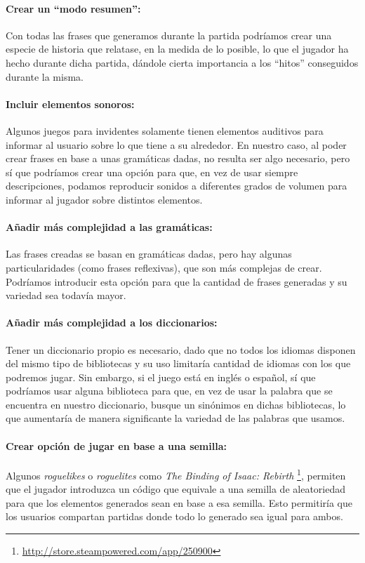 \paragraph{Crear un ``modo resumen'':} Con todas las frases que generamos durante la partida podríamos crear una especie de historia que relatase, en la medida de lo posible, lo que el jugador ha hecho durante dicha partida, dándole cierta importancia a los ``hitos'' conseguidos durante la misma.

\paragraph{Incluir elementos sonoros:} Algunos juegos para invidentes solamente tienen elementos auditivos para informar al usuario sobre lo que tiene a su alrededor. En nuestro caso, al poder crear frases en base a unas gramáticas dadas, no resulta ser algo necesario, pero sí que podríamos crear una opción para que, en vez de usar siempre descripciones, podamos reproducir sonidos a diferentes grados de volumen para informar al jugador sobre distintos elementos.

\paragraph{Añadir más complejidad a las gramáticas:} Las frases creadas se basan en gramáticas dadas, pero hay algunas particularidades (como frases reflexivas), que son más complejas de crear. Podríamos introducir esta opción para que la cantidad de frases generadas y su variedad sea todavía mayor. 

\paragraph{Añadir más complejidad a los diccionarios:} Tener un diccionario propio es necesario, dado que no todos los idiomas disponen del mismo tipo de bibliotecas y su uso limitaría cantidad de idiomas con los que podremos jugar. Sin embargo, si el juego está en inglés o español, sí que podríamos usar alguna biblioteca para que, en vez de usar la palabra que se encuentra en nuestro diccionario, busque un sinónimos en dichas bibliotecas, lo que aumentaría de manera significante la variedad de las palabras que usamos. 

\paragraph{Crear opción de jugar en base a una semilla:} Algunos \textit{roguelikes} o \textit{roguelites} como \textit{The Binding of Isaac: Rebirth} \footnote{\url{http://store.steampowered.com/app/250900}}, permiten que el jugador introduzca un código que equivale a una semilla de aleatoriedad para que los elementos generados sean en base a esa semilla. Esto permitiría que los usuarios compartan partidas donde todo lo generado sea igual para ambos.